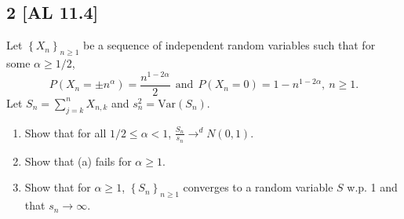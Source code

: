 \documentclass[12pt]{article}
\begin{document}
\subsection*{2 [AL 11.4]}
\begin{tcolorbox}
  Let $\left\{ X_{n} \right\}_{n\geq 1}$ be a sequence of independent random variables such that for some $\alpha \geq 1/2$,
  \[
    P(X_{n} = \pm n^{\alpha}) = \frac{n^{1-2\alpha}}{2} \ \ \text{and} \ \ P(X_{n} = 0) = 1 - n^{1-2\alpha}, \ n\geq 1.
  \]
  Let $S_{n} = \sum_{j=k}^{n}X_{n,k}$ and $s_{n}^{2} = \text{Var}(S_{n})$.
  \begin{enumerate}[label = (\alph*)]
    \item Show that for all $1/2 \leq \alpha < 1$, $\frac{S_{n}}{s_{n}} \rightarrow^{d} N(0,1)$.
    \item Show that (a) fails for $\alpha \geq 1$.
    \item Show that for $\alpha \geq 1$, $\left\{ S_n \right\}_{n\geq 1}$ converges to a random variable $S$ w.p. 1 and that $s_{n} \rightarrow
      \infty$.
  \end{enumerate}
\end{tcolorbox}
\end{document}
